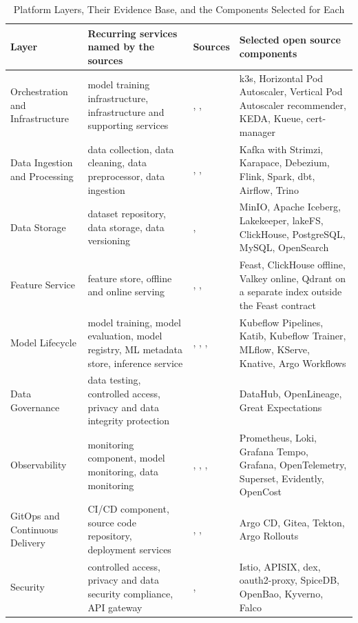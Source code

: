 
\begin{table}[!t]
\caption{Platform Layers, Their Evidence Base, and the Components Selected for Each}
\label{tab:layer_mapping}
\centering
\footnotesize
\begin{tabular}{@{}>{\raggedright\arraybackslash}p{3.0cm}>{\raggedright\arraybackslash}p{5.4cm}>{\raggedright\arraybackslash}p{1.5cm}>{\raggedright\arraybackslash}p{5.6cm}@{}}
\toprule
\textbf{Layer} & \textbf{Recurring services named by the sources} & \textbf{Sources} & \textbf{Selected open source components} \\
\midrule
Orchestration and Infrastructure & model training infrastructure, infrastructure and supporting services & \cite{kreuzberger2023mlops}, \cite{najafabadi2024analysis}, \cite{googlecloud2024mlops} & k3s, Horizontal Pod Autoscaler, Vertical Pod Autoscaler recommender, KEDA, Kueue, cert-manager \\
Data Ingestion and Processing & data collection, data cleaning, data preprocessor, data ingestion & \cite{amershi2019software}, \cite{najafabadi2024analysis}, \cite{munappy2020adhoc} & Kafka with Strimzi, Karapace, Debezium, Flink, Spark, dbt, Airflow, Trino \\
Data Storage & dataset repository, data storage, data versioning & \cite{najafabadi2024analysis}, \cite{munappy2020adhoc} & MinIO, Apache Iceberg, Lakekeeper, lakeFS, ClickHouse, PostgreSQL, MySQL, OpenSearch \\
Feature Service & feature store, offline and online serving & \cite{kreuzberger2023mlops}, \cite{googlecloud2024mlops}, \cite{najafabadi2024analysis} & Feast, ClickHouse offline, Valkey online, Qdrant on a separate index outside the Feast contract \\
Model Lifecycle & model training, model evaluation, model registry, ML metadata store, inference service & \cite{kreuzberger2023mlops}, \cite{amershi2019software}, \cite{googlecloud2024mlops}, \cite{najafabadi2024analysis} & Kubeflow Pipelines, Katib, Kubeflow Trainer, MLflow, KServe, Knative, Argo Workflows \\
Data Governance & data testing, controlled access, privacy and data integrity protection & \cite{munappy2020adhoc} & DataHub, OpenLineage, Great Expectations \\
Observability & monitoring component, model monitoring, data monitoring & \cite{kreuzberger2023mlops}, \cite{amershi2019software}, \cite{najafabadi2024analysis}, \cite{munappy2020adhoc} & Prometheus, Loki, Grafana Tempo, Grafana, OpenTelemetry, Superset, Evidently, OpenCost \\
GitOps and Continuous Delivery & CI/CD component, source code repository, deployment services & \cite{kreuzberger2023mlops}, \cite{googlecloud2024mlops}, \cite{najafabadi2024analysis} & Argo CD, Gitea, Tekton, Argo Rollouts \\
Security & controlled access, privacy and data security compliance, API gateway & \cite{munappy2020adhoc}, \cite{najafabadi2024analysis} & Istio, APISIX, dex, oauth2-proxy, SpiceDB, OpenBao, Kyverno, Falco \\
\bottomrule
\end{tabular}
\end{table}

